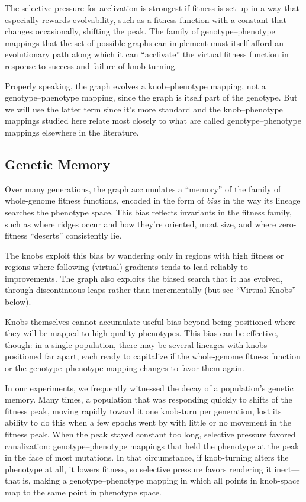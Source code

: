 \documentclass[letterpaper]{article}
\begin{document}
The selective pressure for acclivation is strongest if fitness is set up in a
way that especially rewards evolvability, such as a fitness function with a
constant that changes occasionally, shifting the peak. The family of
genotype--phenotype mappings that the set of possible graphs can implement must
itself afford an evolutionary path along which it can ``acclivate'' the virtual
fitness function in response to success and failure of knob-turning.

Properly speaking, the graph evolves a knob--phenotype mapping, not a
genotype--phenotype mapping, since the graph is itself part of the genotype.
But we will use the latter term since it's more standard and the
knob--phenotype mappings studied here relate most closely to what are called
genotype--phenotype mappings elsewhere in the literature.

\subsection{Genetic Memory}

Over many generations, the graph accumulates a ``memory'' of the family of
whole-genome fitness functions, encoded in the form of \textit{bias} in the way
its lineage searches the phenotype space. This bias reflects invariants in the
fitness family, such as where ridges occur and how they're oriented, moat size,
and where zero-fitness ``deserts'' consistently lie.

The knobs exploit this bias by wandering only in regions with high fitness or
regions where following (virtual) gradients tends to lead reliably to
improvements. The graph also exploits the biased search that it has evolved,
through discontinuous leaps rather than incrementally (but see ``Virtual
Knobs'' below).

Knobs themselves cannot accumulate useful bias beyond being positioned where
they will be mapped to high-quality phenotypes. This bias can be effective,
though: in a single population, there may be several lineages with knobs
positioned far apart, each ready to capitalize if the whole-genome fitness
function or the genotype--phenotype mapping changes to favor them again.

In our experiments, we frequently witnessed the decay of a population's genetic
memory. Many times, a population that was responding quickly to shifts of the
fitness peak, moving rapidly toward it one knob-turn per generation, lost its
ability to do this when a few epochs went by with little or no movement in the
fitness peak. When the peak stayed constant too long, selective pressure
favored canalization: genotype--phenotype mappings that held the phenotype at
the peak in the face of most mutations. In that circumstance, if knob-turning
alters the phenotype at all, it lowers fitness, so selective pressure favors
rendering it inert---that is, making a genotype--phenotype mapping in which all
points in knob-space map to the same point in phenotype space.
\end{document}
